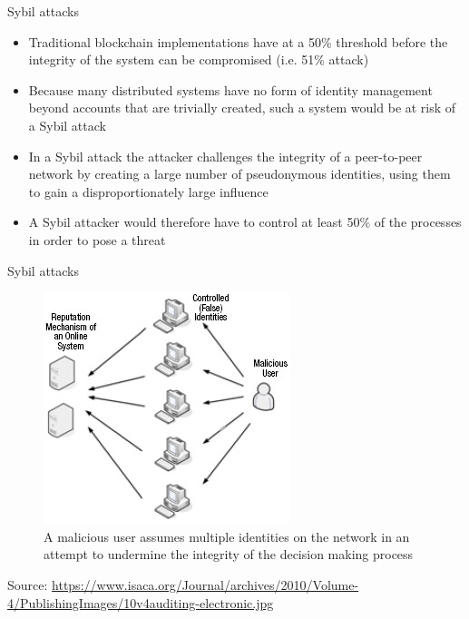 \documentclass[9pt]{beamer}
\begin{document}
\begin{frame}{Sybil attacks}
	\begin{itemize}
		\item Traditional blockchain implementations have at a 50\% threshold before the integrity of the system can be compromised (i.e. 51\% attack)
		\item  Because many distributed systems have no form of identity management beyond accounts that are trivially created, such a system would be at risk of a Sybil attack
		\item In a Sybil attack the attacker challenges the integrity of a peer-to-peer network by creating a large number of pseudonymous identities, using them to gain a disproportionately large influence
		\item A Sybil attacker would therefore have to control at least 50\% of the processes in order to pose a threat
	\end{itemize}
\end{frame}


\begin{frame}{Sybil attacks}
	\begin{figure}[]
		\centering
		\includegraphics  [scale=0.5]{Images/sybil}
		\caption{A malicious user assumes multiple identities on the network in an attempt to undermine the integrity of the decision making process}
	\end{figure}
	\begin{tiny}
		Source: \href{https://www.isaca.org/Journal/archives/2010/Volume-4/Pages/JOnline-Auditing-Electronic-Auction-Systems.aspx}{https://www.isaca.org/Journal/archives/2010/Volume-4/PublishingImages/10v4auditing-electronic.jpg}
	\end{tiny}
\end{frame}
\end{document}
